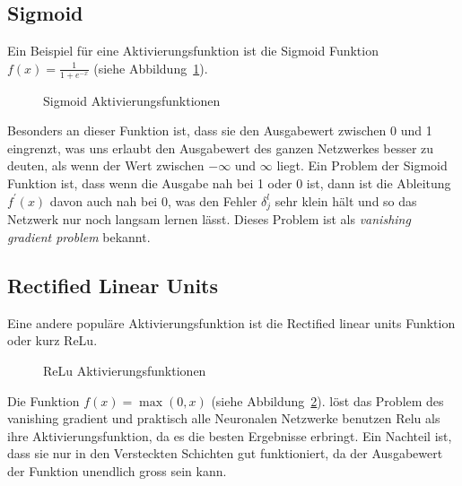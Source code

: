 \documentclass[12pt,a4paper]{report}
\begin{document}
\subsection{Sigmoid}
Ein Beispiel für eine Aktivierungsfunktion ist die Sigmoid Funktion $f(x) = \frac{1}{1 + e^{-x}}$ (siehe Abbildung~\ref{fig:activation1}).
\begin{figure}[h]
    \centering
{}
    \caption{Sigmoid Aktivierungsfunktionen}
    \label{fig:activation1}
\end{figure}
Besonders an dieser Funktion ist, dass sie den Ausgabewert zwischen 0 und 1 eingrenzt, was uns erlaubt den Ausgabewert des ganzen
Netzwerkes besser zu deuten, als wenn der Wert zwischen $-\infty$ und $\infty$ liegt.
Ein Problem der Sigmoid Funktion ist, dass wenn die Ausgabe nah bei 1 oder 0 ist, dann ist die Ableitung $f^\prime(x)$ davon auch nah bei 0,
was den Fehler $\delta^l_j$ sehr klein hält und so das Netzwerk nur noch langsam lernen lässt.
Dieses Problem ist als \textit{vanishing gradient problem} bekannt.
\subsection{Rectified Linear Units}
Eine andere populäre Aktivierungsfunktion ist die Rectified linear units Funktion oder kurz ReLu.
\begin{figure}[h]
    \centering
{}
    \caption{ReLu Aktivierungsfunktionen}
    \label{fig:activation2}
\end{figure}
Die Funktion $f(x) = \max(0, x)$ (siehe Abbildung~\ref{fig:activation2}).
löst das Problem des vanishing gradient und praktisch alle Neuronalen Netzwerke benutzen Relu als ihre Aktivierungsfunktion,
da es die besten Ergebnisse erbringt.\cite{activations}
Ein Nachteil ist, dass sie nur in den Versteckten Schichten gut funktioniert,
da der Ausgabewert der Funktion unendlich gross sein kann.
\end{document}
